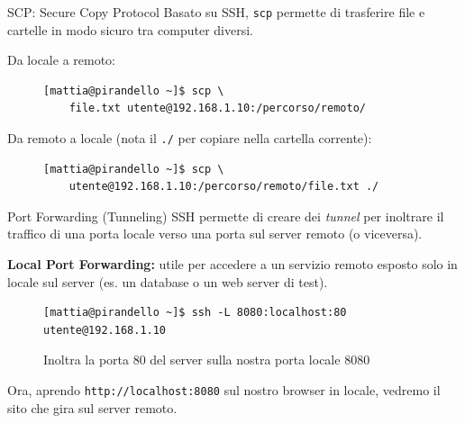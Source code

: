\begin{frame}[fragile]{SCP: Secure Copy Protocol}
  Basato su SSH, \texttt{scp} permette di trasferire file e cartelle in modo sicuro tra computer diversi.

  Da locale a remoto:
  \begin{figure}
    \begin{lstlisting}[backgroundcolor=\color{expowhite!50!white}]
[mattia@pirandello ~]$ scp \
    file.txt utente@192.168.1.10:/percorso/remoto/
\end{lstlisting}
  \end{figure}

  Da remoto a locale (nota il \texttt{./} per copiare nella cartella corrente):
  \begin{figure}
    \begin{lstlisting}[backgroundcolor=\color{expowhite!50!white}]
[mattia@pirandello ~]$ scp \
    utente@192.168.1.10:/percorso/remoto/file.txt ./
\end{lstlisting}
  \end{figure}
\end{frame}


\begin{frame}[fragile]{Port Forwarding (Tunneling)}
  SSH permette di creare dei \textit{tunnel} per inoltrare il traffico di una porta locale verso una porta sul server remoto (o viceversa).

  \textbf{Local Port Forwarding:} utile per accedere a un servizio remoto esposto solo in locale sul server (es. un database o un web server di test).
  \begin{figure}
    \begin{lstlisting}[backgroundcolor=\color{expowhite!50!white}]
[mattia@pirandello ~]$ ssh -L 8080:localhost:80 utente@192.168.1.10
\end{lstlisting}
    \caption{Inoltra la porta 80 del server sulla nostra porta locale 8080}
  \end{figure}\medskip

  Ora, aprendo \texttt{http://localhost:8080} sul nostro browser in locale, vedremo il sito che gira sul server remoto.
\end{frame}


